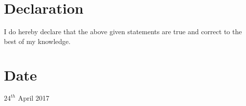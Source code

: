 \documentclass{article}
\newcommand\tab[1][1cm]{\hspace*{#1}}
\begin{document}
	\section*{Declaration}
		\tab I do hereby declare that the above given statements are true and correct to the best of my knowledge.	
		
	 \section*{Date} 
		\tab $24^{th}$ April 2017	
	
\end{document}
